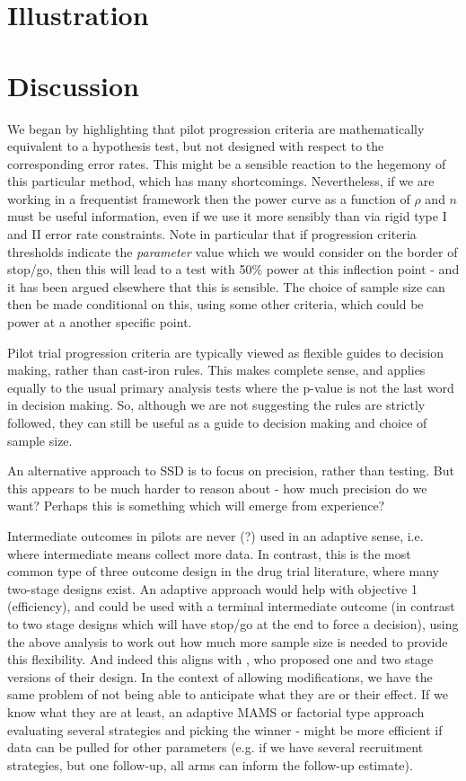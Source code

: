 \documentclass[sagev, Crown]{sagej} %
\begin{document}
\section{Illustration}\label{sec:illustrate}

\section{Discussion}\label{sec:discussion}

We began by highlighting that pilot progression criteria are mathematically equivalent to a hypothesis test, but not designed with respect to the corresponding error rates. This might be a sensible reaction to the hegemony of this particular method, which has many shortcomings. Nevertheless, if we are working in a frequentist framework then the power curve as a function of $\rho$ and $n$ must be useful information, even if we use it more sensibly than via rigid type I and II error rate constraints. Note in particular that if progression criteria thresholds indicate the \emph{parameter} value which we would consider on the border of stop/go, then this will lead to a test with 50\% power at this inflection point - and it has been argued elsewhere that this is sensible. The choice of sample size can then be made conditional on this, using some other criteria, which could be power at a another specific point.

Pilot trial progression criteria are typically viewed as flexible guides to decision making, rather than cast-iron rules. This makes complete sense, and applies equally to the usual primary analysis tests where the p-value is not the last word in decision making. So, although we are not suggesting the rules are strictly followed, they can still be useful as a guide to decision making and choice of sample size.

An alternative approach to SSD is to focus on precision, rather than testing. But this appears to be much harder to reason about - how much precision do we want? Perhaps this is something which will emerge from experience?

Intermediate outcomes in pilots are never (?) used in an adaptive sense, i.e. where intermediate means collect more data. In contrast, this is the most common type of three outcome design in the drug trial literature, where many two-stage designs exist. An adaptive approach would help with objective 1 (efficiency), and could be used with a terminal intermediate outcome (in contrast to two stage designs which will have stop/go at the end to force a decision), using the above analysis to work out how much more sample size is needed to provide this flexibility. And indeed this aligns with \cite{Sargent2001}, who proposed one and two stage versions of their design. In the context of allowing modifications, we have the same problem of not being able to anticipate what they are or their effect. If we know what they are at least, an adaptive MAMS or factorial type approach evaluating several strategies and picking the winner - might be more efficient if data can be pulled for other parameters (e.g. if we have several recruitment strategies, but one follow-up, all arms can inform the follow-up estimate).
\end{document}
